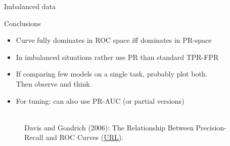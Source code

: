 \begin{vbframe}{Imbalanced data}
%

\end{vbframe}

\begin{vbframe}{Conclusions}

\begin{itemize}
 \item Curve fully dominates in ROC space iff dominates in PR-space
 \item In imbalanced situations rather use PR than standard TPR-FPR
 \item If comparing few models on a single task, probably plot both.\\
 Then observe and think.
\item For tuning: can also use PR-AUC (or partial versions)
\end{itemize}

\vfill

\begin{figure}
  \centering
  \tiny
  \\Davis and Goadrich (2006): The Relationship Between Precision-Recall and
  ROC Curves (\href{https://www.biostat.wisc.edu/~page/rocpr.pdf}
  {\underline{URL}}).
\end{figure}
\end{vbframe}

\endlecture


